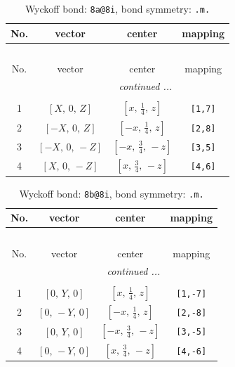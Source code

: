 \documentclass[fleqn,8pt]{jsarticle}
\begin{document}
\begin{longtable}{cccc}
\caption{Wyckoff bond: {\tt 8a@8i}, bond symmetry: {\tt .m.}}
 \\
 \hline \hline
No. & vector & center & mapping \\ \hline \endfirsthead

\multicolumn{3}{l}{\tablename\ \thetable{}} \\
 \hline \hline
No. & vector & center & mapping \\ \hline \endhead

 \hline \hline
\multicolumn{3}{r}{\footnotesize\it continued ...} \\ \endfoot

 \hline \hline
\multicolumn{3}{r}{} \\ \endlastfoot

1 & $\left[ X,\, 0,\, Z \right]$ & $\left[ x,\, \frac{1}{4},\, z \right]$ & {\tt [1,7]} \\ \hline
2 & $\left[ - X,\, 0,\, Z \right]$ & $\left[ - x,\, \frac{1}{4},\, z \right]$ & {\tt [2,8]} \\ \hline
3 & $\left[ - X,\, 0,\, - Z \right]$ & $\left[ - x,\, \frac{3}{4},\, - z \right]$ & {\tt [3,5]} \\ \hline
4 & $\left[ X,\, 0,\, - Z \right]$ & $\left[ x,\, \frac{3}{4},\, - z \right]$ & {\tt [4,6]} \\
\end{longtable}
\renewcommand{\arraystretch}{1.2}
\begin{longtable}{cccc}
\caption{Wyckoff bond: {\tt 8b@8i}, bond symmetry: {\tt .m.}}
 \\
 \hline \hline
No. & vector & center & mapping \\ \hline \endfirsthead

\multicolumn{3}{l}{\tablename\ \thetable{}} \\
 \hline \hline
No. & vector & center & mapping \\ \hline \endhead

 \hline \hline
\multicolumn{3}{r}{\footnotesize\it continued ...} \\ \endfoot

 \hline \hline
\multicolumn{3}{r}{} \\ \endlastfoot

1 & $\left[ 0,\, Y,\, 0 \right]$ & $\left[ x,\, \frac{1}{4},\, z \right]$ & {\tt [1,-7]} \\ \hline
2 & $\left[ 0,\, - Y,\, 0 \right]$ & $\left[ - x,\, \frac{1}{4},\, z \right]$ & {\tt [2,-8]} \\ \hline
3 & $\left[ 0,\, Y,\, 0 \right]$ & $\left[ - x,\, \frac{3}{4},\, - z \right]$ & {\tt [3,-5]} \\ \hline
4 & $\left[ 0,\, - Y,\, 0 \right]$ & $\left[ x,\, \frac{3}{4},\, - z \right]$ & {\tt [4,-6]} \\
\end{longtable}
\end{document}

